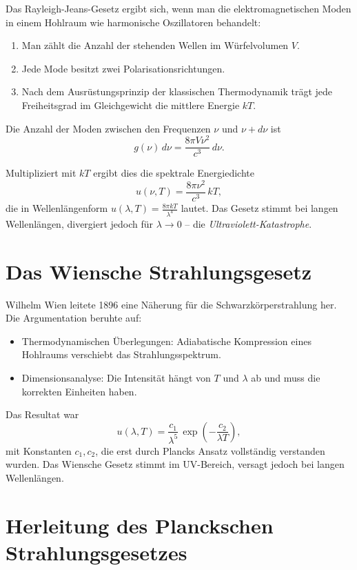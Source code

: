 Das Rayleigh-Jeans-Gesetz ergibt sich, wenn man die elektromagnetischen
Moden in einem Hohlraum wie harmonische Oszillatoren behandelt:

\begin{enumerate}
	\item Man zählt die Anzahl der stehenden Wellen im Würfelvolumen $V$.
	\item Jede Mode besitzt zwei Polarisationsrichtungen.
	\item Nach dem Ausrüstungsprinzip der klassischen Thermodynamik trägt
	jede Freiheitsgrad im Gleichgewicht die mittlere Energie $kT$.
\end{enumerate}

Die Anzahl der Moden zwischen den Frequenzen $\nu$ und $\nu + d\nu$ ist
\[
g(\nu)\, d\nu = \frac{8\pi V \nu^2}{c^3}\, d\nu.
\]

Multipliziert mit $kT$ ergibt dies die spektrale Energiedichte
\[
u(\nu, T) = \frac{8\pi \nu^2}{c^3}\, kT,
\]
die in Wellenlängenform $u(\lambda, T) = \tfrac{8\pi kT}{\lambda^4}$ lautet.
Das Gesetz stimmt bei langen Wellenlängen, divergiert jedoch für
$\lambda \to 0$ – die \emph{Ultraviolett-Katastrophe}.

\section{Das Wiensche Strahlungsgesetz}
\label{anhangA:wien}

Wilhelm Wien leitete 1896 eine Näherung für die Schwarzkörperstrahlung her.
Die Argumentation beruhte auf:

\begin{itemize}
	\item Thermodynamischen Überlegungen: Adiabatische Kompression eines
	Hohlraums verschiebt das Strahlungsspektrum.
	\item Dimensionsanalyse: Die Intensität hängt von $T$ und $\lambda$ ab
	und muss die korrekten Einheiten haben.
\end{itemize}

Das Resultat war
\[
u(\lambda, T) = \frac{c_1}{\lambda^5}\,
\exp\!\left(-\frac{c_2}{\lambda T}\right),
\]
mit Konstanten $c_1, c_2$, die erst durch Plancks Ansatz vollständig
verstanden wurden. Das Wiensche Gesetz stimmt im UV-Bereich,
versagt jedoch bei langen Wellenlängen.

\section{Herleitung des Planckschen Strahlungsgesetzes}
\label{anhangA:planck}

